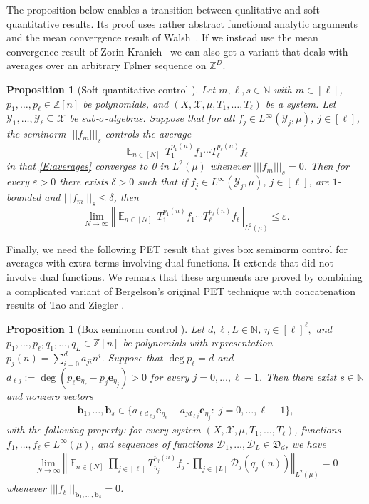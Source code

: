 \documentclass[11pt]{amsart}
\newtheorem{proposition}[lemma]{Proposition}
\theoremstyle{definition}
\newcommand{\N}{{\mathbb N}}
\newcommand{\Z}{{\mathbb Z}}
\newcommand{\CD}{{\mathcal D}}
\newcommand{\CX}{{\mathcal X}}
\newcommand{\CY}{{\mathcal Y}}
\newcommand{\FD}{{\mathfrak D}}
\newcommand{\be}{{\mathbf{e}}}
\renewcommand{\b}{{\textbf{b}}}
\newcommand{\norm}[1]{\left\Vert #1\right\Vert}
\newcommand{\nnorm}[1]{\lvert\!|\!| #1|\!|\!\rvert}
\DeclareMathOperator*{\E}{\mathbb{E}}
\begin{document}
 The proposition below enables a transition between qualitative and soft quantitative results. Its proof  uses  rather abstract functional analytic arguments and  the mean convergence result of Walsh~\cite{Wal12}. If we instead use the mean convergence result of Zorin-Kranich~\cite{Zo15a} we can also get a variant that deals with averages over an arbitrary F\o lner sequence on $\Z^D$.
\begin{proposition}[Soft quantitative control {\cite[Proposition A.1]{FrKu22}}]\label{P:Us}
	Let $m, \ell, s\in\N$ with $m\in[\ell]$, $p_1, \ldots, p_\ell\in\Z[n]$ be polynomials,  and $(X, \CX, \mu, T_1,\ldots, T_\ell)$ be a system. Let $\CY_1, \ldots, \CY_\ell\subseteq\CX$ be sub-$\sigma$-algebras. Suppose that for all $f_j\in L^\infty(\CY_j, \mu)$, $j\in[\ell]$, the seminorm $\nnorm{f_m}_{s}$ controls   the average
	\begin{equation}\label{E:averages}
		\E_{n\in[N]}  \, T_1^{p_1(n)}f_1\cdots T_\ell^{p_\ell(n)}f_\ell
	\end{equation}
	in that \eqref{E:averages} converges to 0 in $L^2(\mu)$ whenever $\nnorm{f_m}_{s} = 0$.
	Then for every	$\varepsilon>0$	there exists  $\delta>0$ such that if
	$f_j\in L^\infty(\CY_j, \mu)$, $j\in[\ell]$,  are $1$-bounded and  $\nnorm{f_m}_{s}\leq \delta$, then
			$$
			\lim_{N\to\infty} \norm{\E_{n\in[N]} \,  T_1^{p_1(n)}f_1\cdots T_\ell^{p_\ell(n)}f_\ell}_{L^2(\mu)}\leq \varepsilon.
			$$
\end{proposition}


 Finally, we need the following PET result  that gives box seminorm control for averages with extra terms involving dual functions. It extends  \cite[Theorem~2.5]{DFMKS21} that did not involve dual functions. We remark that these arguments  are proved by combining a complicated variant of Bergelson's original PET technique \cite{Be87a}  with  concatenation results of Tao and Ziegler \cite{TZ16}.
\begin{proposition}[Box seminorm control {\cite[Proposition B.1]{FrKu22}}]\label{strong PET bound}
Let $d, \ell, L\in\N$, $\eta\in[\ell]^\ell,$ and $p_1, \ldots, p_\ell, q_1, \ldots, q_L\in\Z[n]$ be polynomials with representation $p_j(n) = \sum_{i=0}^d a_{ji} n^i$. Suppose that $\deg p_\ell = d$ and $d_{\ell j} := \deg(p_\ell \be_{\eta_\ell} - p_j \be_{\eta_j})>0$ for every $j=0, \ldots, \ell-1$. Then there exist $s\in\N$ and nonzero vectors
\begin{align}\label{E:coefficientvectors}
    \b_1, \ldots, \b_s \in \{a_{\ell d_{\ell j}}\be_{\eta_\ell}- a_{j d_{\ell j}}\be_{\eta_j}:\; j = 0, \ldots, \ell-1\},
\end{align}
with the following property: for every system $(X, \CX, \mu, T_1, \ldots, T_\ell)$,  functions $f_1, \ldots, f_\ell\in L^\infty(\mu)$, and sequences of functions $\CD_1, \ldots, \CD_L\in\FD_d$, we have
\begin{align*}%
     \lim_{N\to\infty}\norm{\E_{n\in[N]}\prod_{j\in[\ell]}T_{\eta_j}^{p_j(n)}f_j\cdot\prod_{j\in[L]}\CD_{j}(q_j(n))}_{L^2(\mu)}=0
\end{align*}
whenever $\nnorm{f_\ell}_{{\b_1}, \ldots, {\b_s}}=0$.
\end{proposition}
\end{document}
